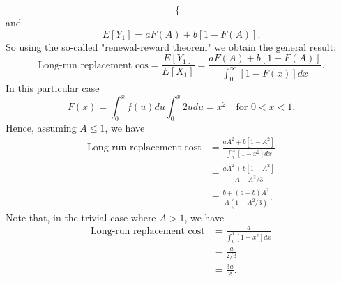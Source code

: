 \documentclass[11pt,a4paper]{article}
\begin{document}
\begin{enumerate}
$$\begin{cases}
    \end{cases}
    $$
    and
    $$
    E[Y_1] = aF(A) + b[1 - F(A)].
    $$
    So using the so-called "renewal-reward theorem" we obtain the general result:
    $$
    \text{Long-run replacement cos} = \frac{E[Y_1]}{E[X_1]} = \frac{aF(A) + b[1 - F(A)]}{\int_0^\infty[1 - F(x)]dx}.
    $$
    In this particular case
    $$
    F(x) = \int_0^x f(u)du\int_0^x 2udu = x^2\quad \text{for $0 < x < 1$}.
    $$
    Hence, assuming $A \leq 1$, we have
    \begin{align*}
      \text{Long-run replacement cost}
      &= \frac{aA^2 + b[1 - A^2]}{\int_0^A[1 - x^2]dx}\\
      &= \frac{aA^2 + b[1 - A^2]}{A - A^3/3}\\
      &= \frac{b + (a - b)A^2}{A(1 - A^2/3)}.
    \end{align*}
    Note that, in the trivial case where $A > 1$, we have
    \begin{align*}
      \text{Long-run replacement cost}
      &= \frac{a}{\int_0^1[1 - x^2]dx}\\
      &= \frac{a}{2/3}\\
      &= \frac{3a}{2}.
    \end{align*}
  \end{enumerate}
\end{document}
